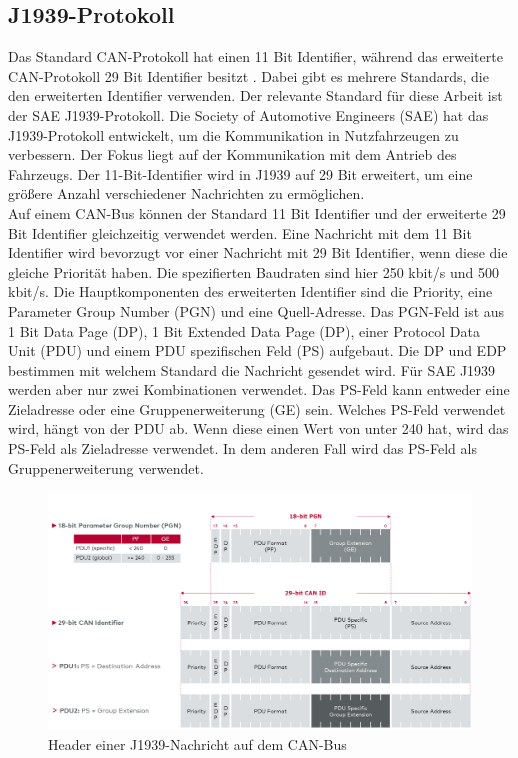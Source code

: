 \subsection{J1939-Protokoll}
Das Standard CAN-Protokoll hat einen 11 Bit Identifier, während das erweiterte CAN-Protokoll 29 Bit Identifier
besitzt \cite{Murvay2018}. Dabei gibt es mehrere Standards, die den erweiterten Identifier verwenden.
Der relevante Standard für diese Arbeit ist der SAE J1939-Protokoll.
Die Society of Automotive Engineers (SAE) hat das J1939-Protokoll entwickelt, um die Kommunikation in Nutzfahrzeugen
zu verbessern. Der Fokus liegt auf der Kommunikation mit dem Antrieb des Fahrzeugs. Der 11-Bit-Identifier wird in J1939 
auf 29 Bit erweitert, um eine größere Anzahl verschiedener Nachrichten zu ermöglichen.\\
Auf einem CAN-Bus können der Standard 11 Bit Identifier und der erweiterte 29 Bit Identifier gleichzeitig verwendet werden.
Eine Nachricht mit dem 11 Bit Identifier wird bevorzugt vor einer Nachricht mit 29 Bit Identifier, wenn diese die gleiche
Priorität haben. Die spezifierten Baudraten sind hier 250 kbit/s und 500 kbit/s. Die Hauptkomponenten des
erweiterten Identifier sind die Priority, eine Parameter Group Number (PGN) und eine Quell-Adresse.
Das PGN-Feld ist aus 1 Bit Data Page (DP), 1 Bit Extended Data Page (DP), einer Protocol Data Unit (PDU) und einem PDU spezifischen 
Feld (PS) aufgebaut. Die DP und EDP bestimmen mit welchem Standard die 
Nachricht gesendet wird. Für SAE J1939 werden aber nur zwei Kombinationen verwendet. 
Das PS-Feld kann entweder eine Zieladresse oder eine Gruppenerweiterung (GE) sein. Welches PS-Feld
verwendet wird, hängt von der PDU ab. Wenn diese einen Wert von unter 240 hat, wird das PS-Feld als Zieladresse verwendet. 
In dem anderen Fall wird das PS-Feld als Gruppenerweiterung verwendet.
\begin{figure}[H]
    \centering
    \includegraphics[scale=0.28]{images/j1939header.png}
    \caption{Header einer J1939-Nachricht auf dem CAN-Bus \cite{VectorSAE}}
    \label{fig:j1939header}
\end{figure}

